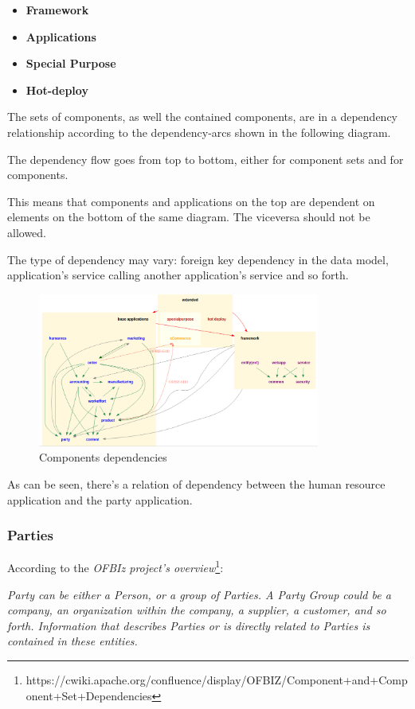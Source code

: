 \begin{itemize}
	\item \textbf{Framework}
	\item \textbf{Applications}
	\item \textbf{Special Purpose}
	\item \textbf{Hot-deploy}
\end{itemize}

The sets of components, as well the contained components, are in a dependency relationship according to the dependency-arcs shown in the following diagram.

The dependency flow goes from top to bottom, either for component sets and for components.

This means that components and applications on the top are dependent on elements on the bottom of the same diagram. The viceversa should not be allowed.

The type of dependency may vary: foreign key dependency in the data model, application's service calling another application's service and so forth.

\begin{figure}[H]
	\centerline{
		\includegraphics[width=350px]{../Datas/images/dependencies.png}
	}
	\label{fig:components-dependencies}
	\caption{Components dependencies}
\end{figure}

As can be seen, there's a relation of dependency between the human resource application and the party application.
\newpage

\subsubsection{Parties}
According to the {\textit{OFBIz project's overview}}\footnote{https://cwiki.apache.org/confluence/display/OFBIZ/Component+and+Component+Set+Dependencies}:

\textit{Party can be either a Person, or a group of Parties. A Party Group could be a company, an organization within the company, a supplier, a customer, and so forth.
Information that describes Parties or is directly related to Parties is contained in these entities.}

